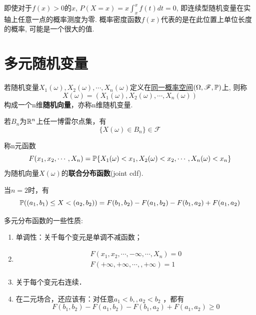 \begin{remark}
    即使对于$f(x)>0$的$x$, $P(X=x)=x\int_{x}^x f(t)dt=0$, 即连续型随机变量在实轴上任意一点的概率测度为零. 概率密度函数$f(x)$代表的是在此位置上单位长度的概率, 可能是一个很大的值.
\end{remark}

\section{多元随机变量}

\begin{definition}[随机向量]
    若随机变量$X_1(\omega), X_2(\omega),\cdots , X_n(\omega)$定义在\underline{同一概率空间}$(\Omega,\mathscr{F},\P)$上, 则称
    \[ X(\omega) = (X_1(\omega), X_2(\omega),\cdots , X_n(\omega)) \]
    构成一个n维\textbf{随机向量}，亦称n维随机变量.
\end{definition}

\begin{proposition}
    若$B_n$为$\R^n$上任一博雷尔点集，有
    \[ \{ X(\omega) \in B_n \} \in \mathscr{F} \]
\end{proposition}

\begin{definition}
    称n元函数
    \[ F(x_1,x_2, \cdots , X_n)=\P \{ X_1(\omega)<x_1, X_2(\omega)<x_2,\cdots , X_n(\omega)<x_n \} \]
    为随机向量$X(\omega)$的\textbf{联合分布函数}(joint cdf).
\end{definition}

当$n=2$时，有
\begin{equation}\label{equ:2dim_Prob}
\P((a_1,b_1)\le X < (a_2,b_2))=F(b_1,b_2)-F(a_1,b_2)-F(b_1,a_2)+F(a_1,a_2)
\end{equation}

\begin{property}
    多元分布函数的一些性质:
    \begin{enumerate}
        \item 单调性：关千每个变元是单调不减函数；
        \item \begin{align*}
                  F(x_1,x_2, \cdots, -\infty, \cdots, X_n)=0 \\
                  F(+\infty,+\infty, \cdots, , +\infty)=1
              \end{align*}
        \item 关于每个变元右连续．
        \item 在二元场合，还应该有：对任意$ a_1 <b,,a_2<b_2$ ，都有
              \[ F(b_1,b_2)-F(a_1,b_2)-F(b_1,a_2)+F(a_1,a_2)\ge 0   \]
    \end{enumerate}
\end{property}

